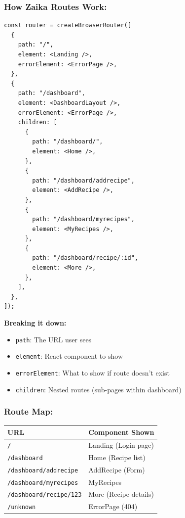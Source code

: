 \documentclass[12pt]{article}
\begin{document}
\subsubsection*{How Zaika Routes Work:}

\begin{lstlisting}
const router = createBrowserRouter([
  {
    path: "/",
    element: <Landing />,
    errorElement: <ErrorPage />,
  },
  {
    path: "/dashboard",
    element: <DashboardLayout />,
    errorElement: <ErrorPage />,
    children: [
      {
        path: "/dashboard/",
        element: <Home />,
      },
      {
        path: "/dashboard/addrecipe",
        element: <AddRecipe />,
      },
      {
        path: "/dashboard/myrecipes",
        element: <MyRecipes />,
      },
      {
        path: "/dashboard/recipe/:id",
        element: <More />,
      },
    ],
  },
]);
\end{lstlisting}

\textbf{Breaking it down:}

\begin{itemize}
    \item \texttt{path}: The URL user sees
    \item \texttt{element}: React component to show
    \item \texttt{errorElement}: What to show if route doesn't exist
    \item \texttt{children}: Nested routes (sub-pages within dashboard)
\end{itemize}

\subsubsection*{Route Map:}

\begin{center}
\begin{tabular}{|l|l|}
\hline
\textbf{URL} & \textbf{Component Shown} \\
\hline
\texttt{/} & Landing (Login page) \\
\texttt{/dashboard} & Home (Recipe list) \\
\texttt{/dashboard/addrecipe} & AddRecipe (Form) \\
\texttt{/dashboard/myrecipes} & MyRecipes \\
\texttt{/dashboard/recipe/123} & More (Recipe details) \\
\texttt{/unknown} & ErrorPage (404) \\
\hline
\end{tabular}
\end{center}
\end{document}
